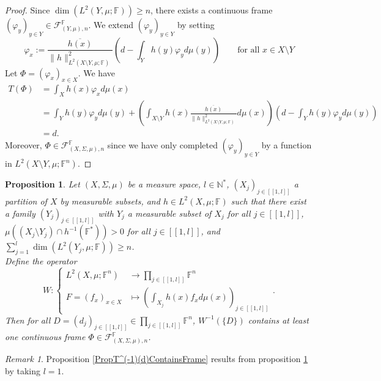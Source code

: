 \documentclass[a4paper,12pt]{article}
\theoremstyle{plain}
\newtheorem{proposition}{Proposition}[section]
\theoremstyle{definition}
\theoremstyle{remark}
\newtheorem{remark}{Remark}[section]
\begin{document}
\begin{proof}
Since $\dim(L^2(Y,\mu;\mathbb{F})) \geq n$, there exists a continuous frame $(\varphi_y)_{y \in Y} \in \mathcal{F}_{(Y,\mu),n}^\mathbb{F}$. We extend $(\varphi_y)_{y \in Y}$ by setting 
\[ \varphi_x := \frac{\overline{h(x)}}{\lVert h \rVert_{L^2(X \setminus Y,\mu;\mathbb{F})}^2}\left(d - \int_Y h(y)\varphi_y d\mu(y) \right) \qquad \text{for all } x \in X \setminus Y \]
Let $\Phi = (\varphi_x)_{x \in X}$. We have 
\begin{align*}
 T(\Phi)  &= \int_X h(x)\varphi_x d\mu(x) \\
&= \int_Y h(y)\varphi_y d\mu(y) + \left( \int_{X \setminus Y} h(x) \frac{\overline{h(x)}}{\lVert h \rVert_{L^2(X\setminus Y,\mu;\mathbb{F})}^2} d\mu(x) \right) (d -  \int_Y h(y)\varphi_y d\mu(y)) \\
&= d.
\end{align*}
Moreover, $\Phi \in \mathcal{F}_{(X,\Sigma,\mu),n}^\mathbb{F}$ since we have only completed $(\varphi_y)_{y \in Y}$ by a function in $L^2(X \setminus Y,\mu;\mathbb{F}^n)$.
\end{proof}


\begin{proposition}
\label{PropW^(-1)(D)ContainsFrame}
Let $(X,\Sigma,\mu)$ be a measure space, $l \in \mathbb{N}^*$, $(X_j)_{j \in [\![1,l]\!]}$ a partition of $X$ by measurable subsets, and $h \in L^2(X,\mu;\mathbb{F})$ such that there exist a family $(Y_j)_{j \in [\![1,l]\!]}$ with $Y_j$ a measurable subset of $X_j$ for all $j \in [\![1,l]\!]$, $\mu((X_j \setminus Y_j) \cap h^{-1}(\mathbb{F}^*)) > 0$ for all $j \in [\![1,l]\!]$, and $\sum\limits_{j=1}^l \dim(L^2(Y_j,\mu;\mathbb{F})) \geq n$. \\
Define the operator 
\[ W : \begin{cases} L^2(X,\mu;\mathbb{F}^n) &\to \prod_{j \in [\![1,l]\!]} \mathbb{F}^n \\ F = (f_x)_{x \in X} &\mapsto (\int_{X_j} h(x)f_x d\mu(x))_{j \in [\![1,l]\!]} \end{cases}. \]
Then for all $D = (d_j)_{j \in [\![1,l]\!]} \in \prod_{j \in [\![1,l]\!]} \mathbb{F}^n$, $W^{-1}(\{D\})$ contains at least one continuous frame $\Phi \in \mathcal{F}_{(X,\Sigma,\mu),n}^\mathbb{F}$.
\end{proposition}

\begin{remark}
Proposition \ref{PropT^(-1)(d)ContainsFrame} results from proposition \ref{PropW^(-1)(D)ContainsFrame} by taking $l = 1$.
\end{remark}
\end{document}
